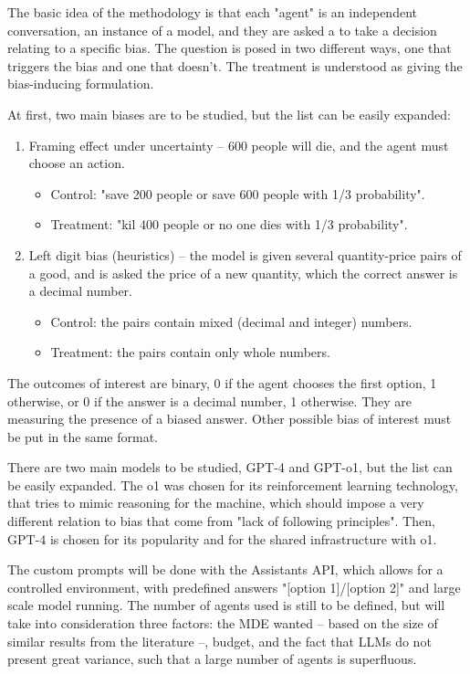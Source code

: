 \documentclass[12pt]{article}
\begin{document}
The basic idea of the methodology is that each "agent" is an independent conversation, an instance of a model, and they are asked a to take a decision relating to a specific bias. The question is posed in two different ways, one that triggers the bias and one that doesn't. The treatment is understood as giving the bias-inducing formulation.

At first, two main biases are to be studied, but the list can be easily expanded:

\begin{enumerate}
  \item Framing effect under uncertainty -- 600 people will die, and the agent must choose an action.
  \begin{itemize}
    \item Control: "save 200 people or save 600 people with 1/3 probability".
    \item Treatment: "kil 400 people or no one dies with 1/3 probability".
  \end{itemize} 
  \item Left digit bias (heuristics) -- the model is given several quantity-price pairs of a good, and is asked the price of a new quantity, which the correct answer is a decimal number.
  \begin{itemize}
    \item Control: the pairs contain mixed (decimal and integer) numbers.
    \item Treatment: the pairs contain only whole numbers.
  \end{itemize}  
\end{enumerate}

The outcomes of interest are binary, 0 if the agent chooses the first option, 1 otherwise, or 0 if the answer is a decimal number, 1 otherwise. They are measuring the presence of a biased answer. Other possible bias of interest must be put in the same format.

There are two main models to be studied, GPT-4 and GPT-o1, but the list can be easily expanded. The o1 was chosen for its reinforcement learning technology, that tries to mimic reasoning for the machine, which should impose a very different relation to bias that come from "lack of following principles". Then, GPT-4 is chosen for its popularity and for the shared infrastructure with o1.

The custom prompts will be done with the Assistants API, which allows for a controlled environment, with predefined answers "[option 1]/[option 2]" and large scale model running. The number of agents used is still to be defined, but will take into consideration three factors: the MDE wanted -- based on the size of similar results from the literature --, budget, and the fact that LLMs do not present great variance, such that a large number of agents is superfluous.
\end{document}
